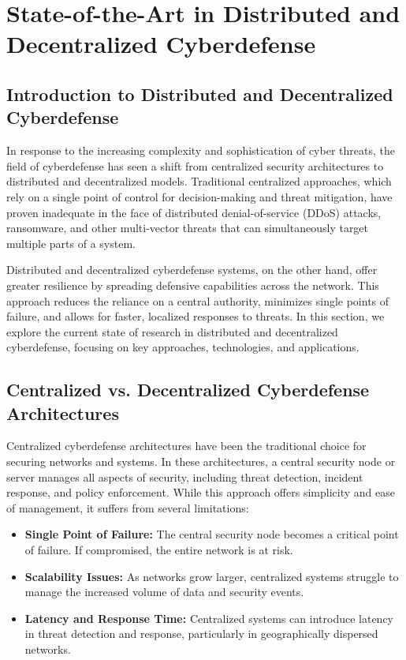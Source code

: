 \section{State-of-the-Art in Distributed and Decentralized Cyberdefense}

\subsection{Introduction to Distributed and Decentralized Cyberdefense}

In response to the increasing complexity and sophistication of cyber threats, the field of cyberdefense has seen a shift from centralized security architectures to distributed and decentralized models. Traditional centralized approaches, which rely on a single point of control for decision-making and threat mitigation, have proven inadequate in the face of distributed denial-of-service (DDoS) attacks, ransomware, and other multi-vector threats that can simultaneously target multiple parts of a system.

Distributed and decentralized cyberdefense systems, on the other hand, offer greater resilience by spreading defensive capabilities across the network. This approach reduces the reliance on a central authority, minimizes single points of failure, and allows for faster, localized responses to threats. In this section, we explore the current state of research in distributed and decentralized cyberdefense, focusing on key approaches, technologies, and applications.

\subsection{Centralized vs. Decentralized Cyberdefense Architectures}

Centralized cyberdefense architectures have been the traditional choice for securing networks and systems. In these architectures, a central security node or server manages all aspects of security, including threat detection, incident response, and policy enforcement. While this approach offers simplicity and ease of management, it suffers from several limitations:

\begin{itemize}
    \item \textbf{Single Point of Failure:} The central security node becomes a critical point of failure. If compromised, the entire network is at risk.
    \item \textbf{Scalability Issues:} As networks grow larger, centralized systems struggle to manage the increased volume of data and security events.
    \item \textbf{Latency and Response Time:} Centralized systems can introduce latency in threat detection and response, particularly in geographically dispersed networks.
\end{itemize}

